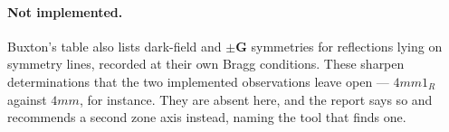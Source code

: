 \paragraph{Not implemented.} Buxton's table also lists dark-field and \(\pm\mathbf{G}\)
symmetries for reflections lying on symmetry lines, recorded at their own Bragg conditions.
These sharpen determinations that the two implemented observations leave open --- \(4mm1_R\)
against \(4mm\), for instance. They are absent here, and the report says so and recommends a
second zone axis instead, naming the tool that finds one.
